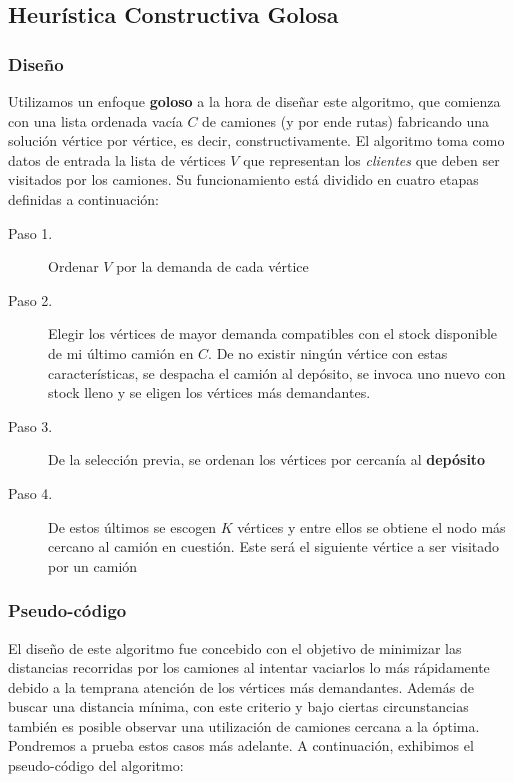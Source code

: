 \subsection{Heurística Constructiva Golosa}
\subsubsection{Diseño}
\label{sec:greedy-design}
Utilizamos un enfoque \textbf{goloso} a la hora de diseñar este algoritmo, que comienza con una lista ordenada vacía $C$ de camiones (y por ende rutas) fabricando una solución vértice por vértice, es decir, constructivamente. El algoritmo toma como datos de entrada la lista de vértices $V$ que representan los \textit{clientes} que deben ser visitados por los camiones. Su funcionamiento está dividido en cuatro etapas definidas a continuación:

\begin{description}
\item[Paso 1.] Ordenar $V$ por la demanda de cada vértice
\item[Paso 2.] Elegir los vértices de mayor demanda compatibles con el stock disponible de mi último camión en $C$. De no existir ningún vértice con estas características, se despacha el camión al depósito, se invoca uno nuevo con stock lleno y se eligen los vértices más demandantes.
\item[Paso 3.] De la selección previa, se ordenan los vértices por cercanía al \textbf{depósito}
\item[Paso 4.] De estos últimos se escogen $K$ vértices y entre ellos se obtiene el nodo más cercano al camión en cuestión. Este será el siguiente vértice a ser visitado por un camión
\end{description}

\subsubsection{Pseudo-código}
El diseño de este algoritmo fue concebido con el objetivo de minimizar las distancias recorridas por los camiones al intentar vaciarlos lo más rápidamente debido a la temprana atención de los vértices más demandantes. Además de buscar una distancia mínima, con este criterio y bajo ciertas circunstancias también es posible observar una utilización de camiones cercana a la óptima. Pondremos a prueba estos casos más adelante. A continuación, exhibimos el pseudo-código del algoritmo:

